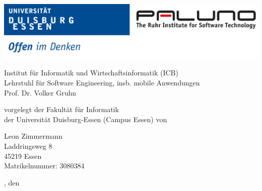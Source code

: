 \pagestyle{empty} %

\includegraphics[width=\textwidth]{./img/logo_unidue_paluno_deutsch.pdf}

\begin{sffamily}

\begin{center}

\vspace*{0.7cm}

\normalsize{Institut für Informatik und Wirtschaftsinformatik (ICB)\\%
Lehrstuhl für Software Engineering, insb. mobile Anwendungen\\
Prof. Dr. Volker Gruhn}


\vspace*{2.5cm}

\LARGE{\documentHeading}

\vspace*{1cm}

\large{\documentHeadingEnglish}

\vspace*{1cm}

\large{\documentType}

\vspace*{0.5cm}

\normalsize{vorgelegt der Fakultät für Informatik\\
der Universität Duisburg-Essen (Campus Essen) von}

\vspace*{\baselineskip}

\normalsize{
Leon Zimmermann \\
Laddringsweg 8 \\
45219 Essen \\
Matrikelnummer: 3080384
}

\vspace*{1.5cm}

\small{\documentLocation, den \documentDate}

\vspace*{1.5cm}


\end{center}
\end{sffamily}
